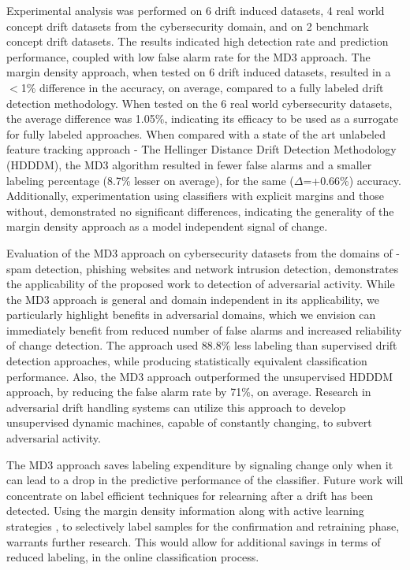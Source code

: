 \documentclass[authoryear,3p,times,twocolumn]{elsarticle}
\begin{document}
Experimental analysis was performed on 6 drift induced datasets, 4 real world concept drift datasets from the cybersecurity domain, and on 2 benchmark concept drift datasets. The results indicated high detection rate and prediction performance, coupled with low false alarm rate for the MD3 approach. The margin density approach, when tested on 6 drift induced datasets, resulted in a $<$1\% difference in the accuracy, on average,  compared to a fully labeled drift detection methodology. When tested on the 6 real world cybersecurity datasets, the average difference was 1.05\%, indicating its efficacy to be used as a surrogate for fully labeled approaches. When compared with a state of the art unlabeled feature tracking approach - The Hellinger Distance Drift Detection Methodology (HDDDM), the MD3 algorithm resulted in fewer false alarms and a smaller labeling percentage (8.7\% lesser on average), for the same ($\Delta$=+0.66\%) accuracy.   Additionally, experimentation using classifiers with explicit margins and those without, demonstrated no significant differences, indicating the generality of the margin density approach as a model independent signal of change. 

Evaluation of the MD3 approach on cybersecurity datasets from the domains of - spam detection, phishing websites and network intrusion detection, demonstrates the applicability of the proposed work to detection of adversarial activity. While the MD3 approach is general and domain independent in its applicability, we particularly highlight benefits in adversarial domains, which we envision can immediately benefit from reduced number of false alarms and increased reliability of change detection. The approach used 88.8\% less labeling than supervised drift detection approaches, while producing statistically equivalent classification performance. Also, the MD3 approach outperformed the unsupervised HDDDM approach, by reducing the false alarm rate by 71\%, on average. Research in adversarial drift handling systems \citep{kantchelian2013approaches} can utilize this approach to develop unsupervised dynamic machines, capable of constantly changing, to subvert adversarial activity. 

The MD3 approach saves labeling expenditure by signaling change only when it can lead to a drop in the predictive performance of the classifier. Future work will concentrate on label efficient techniques for relearning after a drift has been detected.  Using the margin density information along with active learning strategies \citep{zliobaite2014active}, to selectively label samples for the confirmation and retraining phase, warrants further research. This would allow for additional savings in terms of reduced labeling, in the online classification process.
\end{document}
